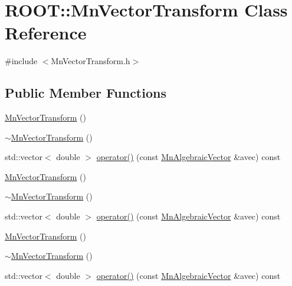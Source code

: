 \hypertarget{classROOT_1_1Minuit2_1_1MnVectorTransform}{}\section{R\+O\+OT\+:\+:Mn\+Vector\+Transform Class Reference}
\label{classROOT_1_1Minuit2_1_1MnVectorTransform}


{\ttfamily \#include $<$Mn\+Vector\+Transform.\+h$>$}

\subsection*{Public Member Functions}
\begin{DoxyCompactItemize}
\item 
\mbox{\hyperlink{classROOT_1_1Minuit2_1_1MnVectorTransform_a03da263b25ee60030130f16641096a24}{Mn\+Vector\+Transform}} ()
\item 
\mbox{\hyperlink{classROOT_1_1Minuit2_1_1MnVectorTransform_a1d3bcb72853e8346075b1cd433dd36fa}{$\sim$\+Mn\+Vector\+Transform}} ()
\item 
std\+::vector$<$ double $>$ \mbox{\hyperlink{classROOT_1_1Minuit2_1_1MnVectorTransform_a2b16b519635ee775a78d3f62663bef89}{operator()}} (const \mbox{\hyperlink{namespaceROOT_1_1Minuit2_a62ed97730a1ca8d3fbaec64a19aa11c9}{Mn\+Algebraic\+Vector}} \&avec) const
\item 
\mbox{\hyperlink{classROOT_1_1Minuit2_1_1MnVectorTransform_a03da263b25ee60030130f16641096a24}{Mn\+Vector\+Transform}} ()
\item 
\mbox{\hyperlink{classROOT_1_1Minuit2_1_1MnVectorTransform_a1d3bcb72853e8346075b1cd433dd36fa}{$\sim$\+Mn\+Vector\+Transform}} ()
\item 
std\+::vector$<$ double $>$ \mbox{\hyperlink{classROOT_1_1Minuit2_1_1MnVectorTransform_a2b16b519635ee775a78d3f62663bef89}{operator()}} (const \mbox{\hyperlink{namespaceROOT_1_1Minuit2_a62ed97730a1ca8d3fbaec64a19aa11c9}{Mn\+Algebraic\+Vector}} \&avec) const
\item 
\mbox{\hyperlink{classROOT_1_1Minuit2_1_1MnVectorTransform_a03da263b25ee60030130f16641096a24}{Mn\+Vector\+Transform}} ()
\item 
\mbox{\hyperlink{classROOT_1_1Minuit2_1_1MnVectorTransform_a1d3bcb72853e8346075b1cd433dd36fa}{$\sim$\+Mn\+Vector\+Transform}} ()
\item 
std\+::vector$<$ double $>$ \mbox{\hyperlink{classROOT_1_1Minuit2_1_1MnVectorTransform_a2b16b519635ee775a78d3f62663bef89}{operator()}} (const \mbox{\hyperlink{namespaceROOT_1_1Minuit2_a62ed97730a1ca8d3fbaec64a19aa11c9}{Mn\+Algebraic\+Vector}} \&avec) const
\end{DoxyCompactItemize}


